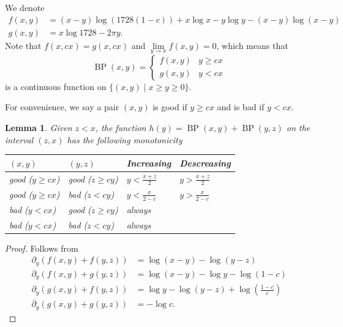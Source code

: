 \documentclass[12pt]{amsart}
\theoremstyle{plain} %
\newtheorem{lemma}      [theorem]{Lemma}
\theoremstyle{definition}
\theoremstyle{remark}
\numberwithin{equation}{section}
\newcommand{\BP}{\operatorname{BP}}
\begin{document}
We denote
\begin{align*}
  f(x,y)&=(x-y)\log(1728(1-c))+x\log x-y\log y -(x-y)\log(x-y)\\
  g(x,y)&=x\log 1728 - 2\pi y.
\end{align*}
Note that $f(x,cx)=g(x,cx)$ and $\lim\limits_{y\to x}f(x,y)=0$,
which means that
\[\BP(x,y)=\begin{cases}f(x,y)&y\geq cx\\g(x,y)&y<cx
\end{cases}
\]
is a continuous function on $\{(x,y)\mid x\geq y\geq
0\}$.

For convenience, we say a pair $(x,y)$ is good if $y\geq cx$ and is bad if $y<cx$. 
\begin{lemma}\label{l:BPdiff}
Given $z< x$, the function $h(y)=\BP(x,y)+\BP(y,z)$ on
the interval $(z,x)$ has the following monotonicity
\begin{center}
\begin{tabular}{llll}
  $(x,y)$&$(y,z)$&Increasing&Descreasing\\
  \hline
  good ($y\geq cx$)&good ($z\geq cy$)&$y< \frac{x+z}{2}$&$y> \frac{x+z}{2}$\\
  good ($y\geq cx$)&bad ($z< cy$)&$y< \frac{x}{2-c}$&$y> \frac{x}{2-c}$\\
  bad ($y< cx$)&good ($z\geq cy$)&always&\\
  bad ($y< cx$)&bad ($z< cy$)&always&
\end{tabular}
\end{center}
\end{lemma}
\begin{proof}
Follows from
\begin{align*}
\partial_y \left(f(x,y)+f(y,z)\right)&=\log(x-y)-\log(y-z)\\
\partial_y \left(f(x,y)+g(y,z)\right)&=\log(x-y)-\log y-\log(1-c)\\
\partial_y \left(g(x,y)+f(y,z)\right)&=\log y -\log(y-z)+\log\left(\frac{1-c}{c}\right)\\
\partial_y \left(g(x,y)+g(y,z)\right)&=-\log c.
\end{align*}

\end{proof}
\end{document}

